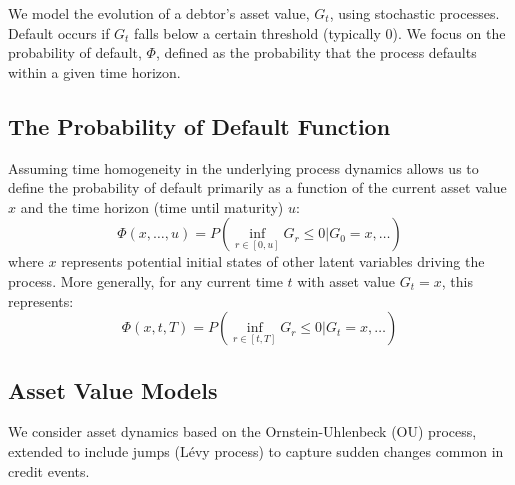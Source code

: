 \documentclass[11pt,twoside,openright]{report}
\begin{document}
We model the evolution of a debtor's asset value, $G_t$, using stochastic processes. Default occurs if $G_t$ falls below a certain threshold (typically 0). We focus on the probability of default, $\Phi$, defined as the probability that the process defaults within a given time horizon.

\subsection{The Probability of Default Function}
Assuming time homogeneity in the underlying process dynamics allows us to define the probability of default primarily as a function of the current asset value $x$ and the time horizon (time until maturity) $u$:
\begin{equation}
\Phi(x, \dots, u) = P\left( \inf_{r \in [0, u]} G_r \le 0 | G_0 = x, \dots \right)
\label{eq:pd_function_basic}
\end{equation}
where $x$ represents potential initial states of other latent variables driving the process. More generally, for any current time $t$ with asset value $G_t = x$, this represents:
\begin{equation}
\Phi(x, t, T) = P\left( \inf_{r \in [t, T]} G_r \le 0 | G_t = x, \dots \right)
\label{eq:pd_function_general}
\end{equation}

\subsection{Asset Value Models}
We consider asset dynamics based on the Ornstein-Uhlenbeck (OU) process, extended to include jumps (Lévy process) to capture sudden changes common in credit events.
\end{document}
